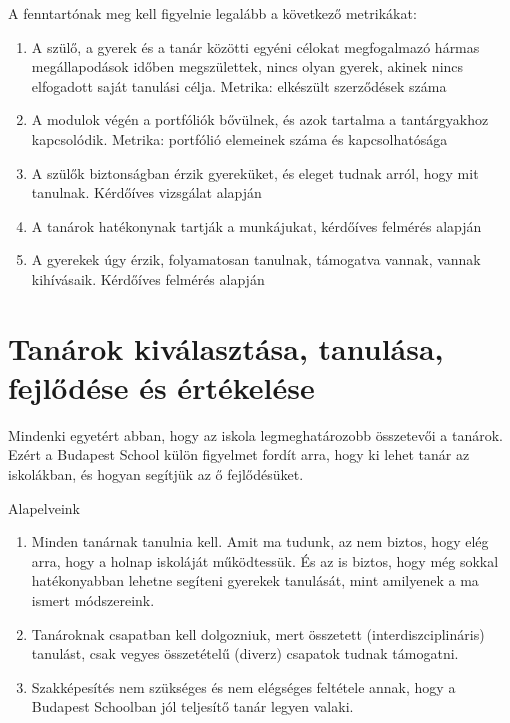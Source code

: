 A fenntartónak meg kell figyelnie legalább a következő metrikákat:
\begin{enumerate}
\item A szülő, a gyerek és a tanár közötti egyéni célokat megfogalmazó hármas megállapodások időben megszülettek, nincs olyan gyerek, akinek nincs elfogadott saját tanulási célja. Metrika: elkészült szerződések száma

\item A modulok végén a portfóliók bővülnek, és azok tartalma a tantárgyakhoz kapcsolódik. Metrika: portfólió elemeinek száma és kapcsolhatósága

\item A szülők biztonságban érzik gyereküket, és eleget tudnak arról, hogy mit tanulnak. Kérdőíves vizsgálat alapján

\item A tanárok hatékonynak tartják a munkájukat, kérdőíves felmérés alapján

\item A gyerekek úgy érzik, folyamatosan tanulnak, támogatva vannak, vannak kihívásaik. Kérdőíves felmérés alapján
\end{enumerate}

\section{Tanárok kiválasztása, tanulása, fejlődése és értékelése}

Mindenki egyetért abban, hogy az iskola legmeghatározobb összetevői a tanárok. Ezért a Budapest School külön figyelmet fordít arra, hogy ki lehet tanár az iskolákban, és hogyan segítjük az ő fejlődésüket.

Alapelveink
\begin{enumerate}
\item Minden tanárnak tanulnia kell. Amit ma tudunk, az nem biztos, hogy elég arra, hogy a holnap iskoláját működtessük. És az is biztos, hogy még sokkal hatékonyabban lehetne segíteni gyerekek tanulását, mint amilyenek a ma ismert módszereink.

\item Tanároknak csapatban kell dolgozniuk, mert összetett (interdiszciplináris) tanulást, csak vegyes összetételű (diverz) csapatok tudnak támogatni.

\item Szakképesítés nem szükséges és nem elégséges feltétele annak, hogy a Budapest Schoolban jól teljesítő tanár legyen valaki.
\end{enumerate}
